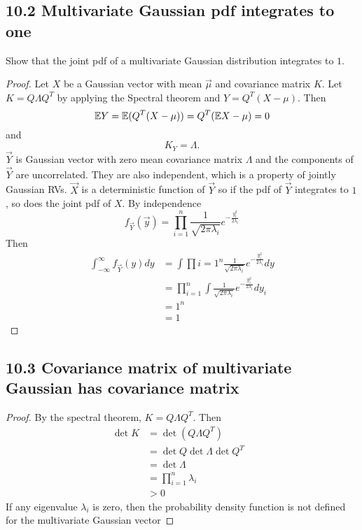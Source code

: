 \documentclass[../main.tex]{subfiles}
\begin{document}
\subsection*{10.2 Multivariate Gaussian pdf integrates to one}
Show that the joint pdf of a multivariate Gaussian distribution integrates to $1$. 
\begin{proof}
    Let $X$ be a Gaussian vector with mean $\vec \mu$ and covariance matrix $K$. Let $K=Q\Lambda Q^T$ by applying the Spectral theorem and $Y = Q^T(X-\mu)$. Then \[
    \mathbb{E} Y = \mathbb{E} (Q^T(X-\mu))=Q^T(\mathbb{E} X-\mu)=0
    \]
    and \[
    K_Y = \Lambda.
    \]
    $\vec Y$ is Gaussian vector with zero mean covariance matrix $\Lambda$ and the components of $\vec Y$ are uncorrelated. They are also independent, which is a property of jointly Gaussian RVs. $\vec X$ is a deterministic function of $\vec Y$ so if the pdf of $\vec Y$ integrates to $1$, so does the joint pdf of $X$.
    \newline 
    By independence \[
    f_{\vec Y}(\vec y)=\prod_{i=1}^n \frac{1}{\sqrt{2\pi\lambda_i}}e^{-\frac{y_i^2}{2\lambda_i}}
    \]
    Then \begin{align*}
        \int_{-\infty}^\infty f_{\vec Y}(y)dy &= \int \prod{i=1}^n \frac{1}{\sqrt{2\pi\lambda_i}}e^{-\frac{y_i^2}{2\lambda_i}} dy\\
        &= \prod_{i=1}^n \int \frac{1}{\sqrt{2\pi\lambda_i}}e^{-\frac{y_i^2}{2\lambda_i}} dy_i\\
        &=1^n\\
        &=1
    \end{align*}
\end{proof}
\subsection*{10.3 Covariance matrix of multivariate Gaussian has covariance matrix}
\begin{proof}
    By the spectral theorem, $K=Q\Lambda Q^T$. Then \begin{align*}
        \det K &= \det (Q\Lambda Q^T)\\
        &= \det Q \det \Lambda \det Q^T&\\
        &= \det \Lambda\\
        &= \prod_{i=1}^n \lambda_i\\
        &>0
    \end{align*}
    If any eigenvalue $\lambda_i$ is zero, then the probability density function is not defined for the multivariate Gaussian vector
\end{proof}
\end{document}
